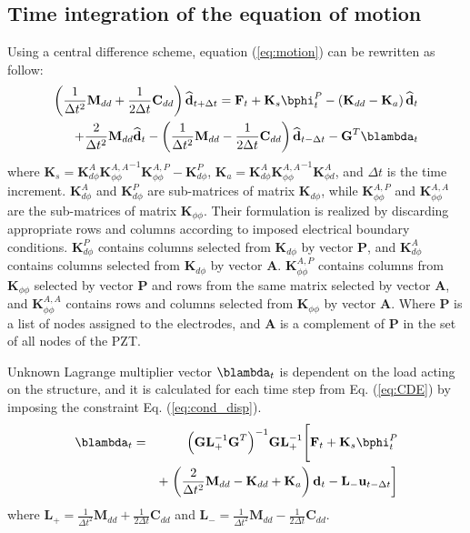 \documentclass[a4paper,12pt]{article}
\begin{document}
\subsection{Time integration of the equation of motion}
\label{sec:time_integration}
Using a central difference scheme, equation (\ref{eq:motion}) can be rewritten as follow:
\begin{eqnarray}
\left(\frac{1}{\Delta t^2}\textbf{M}_{dd}+\frac{1}{2\Delta t}\textbf{C}_{dd} \right)\widehat{\textbf{d}}_{t+\Delta t}=
\textbf{F}_t+\textbf{K}_s\bphi_t^P-\left( \textbf{K}_{dd}-\textbf{K}_a\right)\widehat{\textbf{d}}_t\nonumber\\
+\frac{2}{\Delta t^2}\textbf{M}_{dd}\widehat{\textbf{d}}_t-\left(\frac{1}{\Delta t^2}\textbf{M}_{dd}-\frac{1}{2\Delta t}\textbf{C}_{dd}\right)\widehat{\textbf{d}}_{t-\Delta t}-\textbf{G}^T\blambda_t
\label{eq:CDE}
\end{eqnarray}
where  $\textbf{K}_s=\textbf{K}_{d\phi}^A{\textbf{K}_{\phi \phi}^{A,A}}^{-1}\textbf{K}_{\phi \phi}^{A,P}-\textbf{K}_{d\phi}^P$, 
$\textbf{K}_a=\textbf{K}_{d \phi}^A{\textbf{K}_{\phi \phi}^{A,A}}^{-1}\textbf{K}_{\phi d}^A$, 
and $\Delta t$ is the time increment. 
$\textbf{K}_{d \phi}^A$ and $\textbf{K}_{d\phi}^P$ are sub-matrices of matrix 
$\textbf{K}_{d\phi}$, 
while $\textbf{K}_{\phi \phi}^{A,P}$ and $\textbf{K}_{\phi \phi}^{A,A}$ are the 
sub-matrices of matrix $\textbf{K}_{\phi \phi}$.
Their formulation is realized by discarding appropriate rows and columns 
according to imposed electrical boundary conditions. $\textbf{K}_{d \phi}^P$ 
contains columns selected from $\textbf{K}_{d\phi}$ by vector \textbf{P}, and 
$\textbf{K}_{d\phi}^A$ contains columns selected from $\textbf{K}_{d\phi}$ by 
vector \textbf{A}. $\textbf{K}_{\phi \phi}^{A,P}$ contains columns from 
$\textbf{K}_{\phi \phi}$ selected by vector \textbf{P} and rows from the same 
matrix selected by vector \textbf{A}, and $\textbf{K}_{\phi \phi}^{A,A}$ 
contains rows and columns selected from $\textbf{K}_{\phi \phi}$ by vector 
\textbf{A}. Where \textbf{P} is a list of nodes assigned to the electrodes, and 
\textbf{A} is a complement of \textbf{P} in the set of all nodes of the PZT.

Unknown Lagrange multiplier vector $\blambda_t$ is dependent on the load acting on the structure, and it is calculated for each time step from Eq. (\ref{eq:CDE}) by imposing the constraint Eq. (\ref{eq:cond_disp}).
\begin{eqnarray}
\blambda_t &= &{\left(\textbf{G}\textbf{L}_+^{-1}\textbf{G}^T \right)}^{-1}\textbf{G}\textbf{L}_+^{-1} \Bigg[ \textbf{F}_t+\textbf{K}_s\bphi_t^P\nonumber\\
& & +\left.\left(\frac{2}{\Delta t^2}\textbf{M}_{dd}-\textbf{K}_{dd}+\textbf{K}_a\right)\textbf{d}_t -\textbf{L}_-\textbf{u}_{t-\Delta t} \right]
\end{eqnarray}
where $\textbf{L}_+=\frac{1}{\Delta t^2}\textbf{M}_{dd}+\frac{1}{2\Delta t}\textbf{C}_{dd}$ and $\textbf{L}_-=\frac{1}{\Delta t^2}\textbf{M}_{dd}-\frac{1}{2\Delta t}\textbf{C}_{dd}$.
\end{document}
